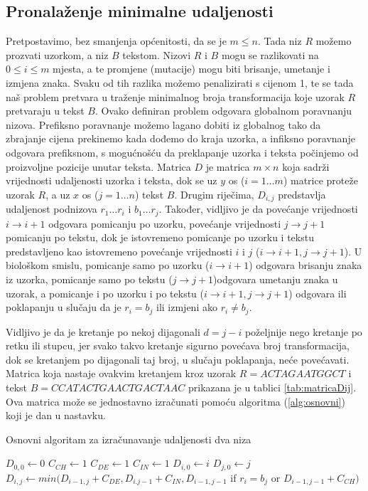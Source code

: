 \documentclass[times, utf8, zavrsni]{fer}
\begin{document}
\subsection{Pronalaženje minimalne udaljenosti}
\label{subsec:osnovniAlgoritam}
Pretpostavimo, bez smanjenja općenitosti, da se je $m{\leq}n$. Tada niz $R$ možemo prozvati uzorkom, a niz $B$ tekstom. Nizovi $R$ i $B$ mogu se razlikovati na $0{\leq}i{\leq}m$ mjesta, a te promjene (mutacije) mogu biti brisanje, umetanje i izmjena znaka. Svaku od tih razlika možemo penalizirati s cijenom 1, te se tada naš problem pretvara u traženje minimalnog broja transformacija koje uzorak $R$ pretvaraju u tekst $B$. Ovako definiran problem odgovara globalnom poravnanju nizova. Prefiksno poravnanje možemo lagano dobiti iz globalnog tako da zbrajanje cijena prekinemo kada dođemo do kraja uzorka, a infiksno poravnanje odgovara prefiksnom, s mogućnošću da preklapanje uzorka i teksta počinjemo od proizvoljne pozicije unutar teksta.
Matrica $D$ je matrica $m{\times}n$ koja sadrži vrijednosti udaljenosti uzorka i teksta, dok se uz $y$ os ($i=1{\dots}m$) matrice proteže uzorak $R$, a uz $x$ os ($j=1{\dots}n$) tekst $B$. Drugim riječima, $D_{i,j}$ predstavlja udaljenost podnizova $r_{1}{\dots}r_{i}$ i $b_{1}{\dots}r_{j}$. Također, vidljivo je da povećanje vrijednosti $i{\rightarrow}i+1$ odgovara pomicanju po uzorku, povećanje vrijednosti $j{\rightarrow}j+1$ pomicanju po tekstu, dok je istovremeno pomicanje po uzorku i tekstu predstavljeno kao istovremeno povećanje vrijednosti $i$ i $j$ ($i{\rightarrow}i+1, j{\rightarrow}j+1$). U biološkom smislu, pomicanje samo po uzorku ($i{\rightarrow}i+1$) odgovara brisanju znaka iz uzorka, pomicanje samo po tekstu ($j{\rightarrow}j+1$)odgovara umetanju znaka u uzorak, a pomicanje i po uzorku i po tekstu ($i{\rightarrow}i+1, j{\rightarrow}j+1$) odgovara ili poklapanju u slučaju da je $r_{i}=b_{j}$ ili izmjeni ako $r_{i} \neq b_{j}$.

Vidljivo je da je kretanje po nekoj dijagonali $d = j-i$ poželjnije nego kretanje po retku ili stupcu, jer svako takvo kretanje sigurno povećava broj transformacija, dok se kretanjem po dijagonali taj broj, u slučaju poklapanja, neće povećavati. Matrica koja nastaje ovakvim kretanjem kroz uzorak $R = ACTAGAATGGCT$ i tekst $B = CCATACTGAACTGACTAAC$ prikazana je u tablici \ref{tab:matricaDij}. Ova matrica može se jednostavno izračunati pomoću algoritma (\ref{alg:osnovni}) koji je dan u nastavku.

\begin{algorithm}
\caption{Osnovni algoritam za izračunavanje udaljenosti dva niza}\label{alg:osnovni}
\begin{algorithmic}
\State $D_{0,0} \gets 0$
\State $C_{CH}\gets 1$ 
\State $C_{DE} \gets 1$
\State $C_{IN} \gets 1$
 \State $D_{i,0} \gets i$ \EndFor
{} \State $D_{j,0} \gets j$ \EndFor
\linebreak
{}
        \State $D_{i,j} \gets min(D_{i-1,j}+C_{DE}, D_{i.j-1}+C_{IN}, D_{i-1,j-1} $ if $r_{i}=b_{j} $ or $ D_{i-1,j-1}+C_{CH})$
    \EndFor
\EndFor
\end{algorithmic}
\end{algorithm}
\end{document}
